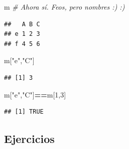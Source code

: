 \documentclass[
]{book}
\newenvironment{Shaded}{\begin{snugshade}}{\end{snugshade}}
\newcommand{\CommentTok}[1]{\textcolor[rgb]{0.56,0.35,0.01}{\textit{#1}}}
\newcommand{\DecValTok}[1]{\textcolor[rgb]{0.00,0.00,0.81}{#1}}
\newcommand{\NormalTok}[1]{#1}
\newcommand{\SpecialCharTok}[1]{\textcolor[rgb]{0.81,0.36,0.00}{\textbf{#1}}}
\newcommand{\StringTok}[1]{\textcolor[rgb]{0.31,0.60,0.02}{#1}}
\begin{document}
\begin{Shaded}
\begin{Highlighting}[]
\NormalTok{m   }\CommentTok{\# Ahora sí. Feos, pero nombres :) :)}
\end{Highlighting}
\end{Shaded}

\begin{verbatim}
##   A B C
## e 1 2 3
## f 4 5 6
\end{verbatim}

\begin{Shaded}
\begin{Highlighting}[]
\NormalTok{m[}\StringTok{"e"}\NormalTok{,}\StringTok{"C"}\NormalTok{]}
\end{Highlighting}
\end{Shaded}

\begin{verbatim}
## [1] 3
\end{verbatim}

\begin{Shaded}
\begin{Highlighting}[]
\NormalTok{m[}\StringTok{"e"}\NormalTok{,}\StringTok{"C"}\NormalTok{]}\SpecialCharTok{==}\NormalTok{m[}\DecValTok{1}\NormalTok{,}\DecValTok{3}\NormalTok{]}
\end{Highlighting}
\end{Shaded}

\begin{verbatim}
## [1] TRUE
\end{verbatim}

\hypertarget{ejercicios}{%
\subsection{Ejercicios}\label{ejercicios}}
\end{document}
